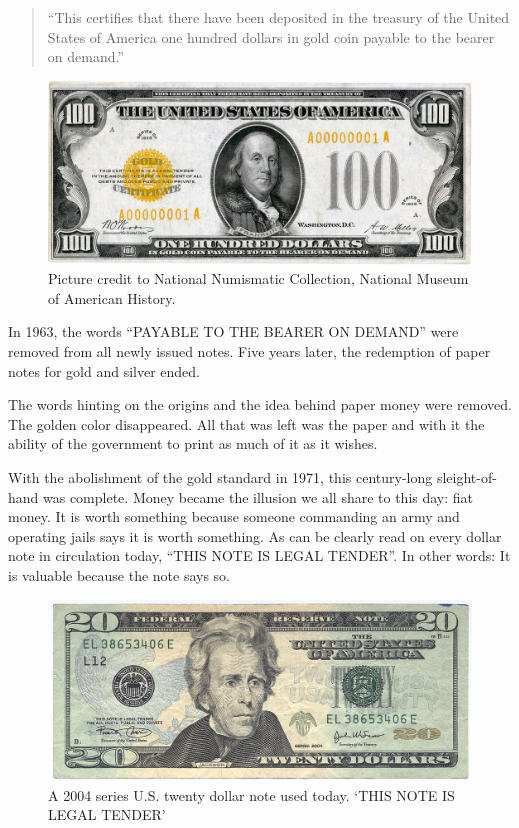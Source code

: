 \begin{quotation}
``This certifies that there have been deposited in the treasury of the
United States of America one hundred dollars in gold coin payable to
the bearer on demand.''
\end{quotation}

\begin{figure}
  \centering
  \includegraphics{assets/images/us-gold-cert-100-smaller.png}
  \caption{Picture credit to National Numismatic Collection, National Museum of American History.}
  \label{fig:us-gold-cert-100-smaller}
\end{figure}

In 1963, the words \enquote{PAYABLE TO THE BEARER ON DEMAND} were removed from
all newly issued notes. Five years later, the redemption of paper notes
for gold and silver ended.

The words hinting on the origins and the idea behind paper money were
removed. The golden color disappeared. All that was left was the paper
and with it the ability of the government to print as much of it as it
wishes.

With the abolishment of the gold standard in 1971, this century-long
sleight-of-hand was complete. Money became the illusion we all share to
this day: fiat money. It is worth something because someone commanding
an army and operating jails says it is worth something. As can be
clearly read on every dollar note in circulation today, \enquote{THIS NOTE IS
LEGAL TENDER}. In other words: It is valuable because the note says so.

\begin{figure}
  \centering
  \includegraphics{assets/images/us-dollar-2004.jpg}
  \caption{A 2004 series U.S. twenty dollar note used today. `THIS NOTE IS LEGAL TENDER'}
  \label{fig:us-dollar-2004}
\end{figure}

